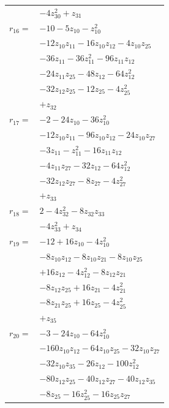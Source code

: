\begin{longtable}{@{}r@{\;}l@{}}
 & \(\displaystyle -4z_{30}^{2} +z_{31}\) \\[3pt]
\(r_{16}=\) & \(\displaystyle -10 -5z_{10} -z_{10}^{2}\) \\
 & \(\displaystyle -12z_{10}z_{11} -16z_{10}z_{12} -4z_{10}z_{25}\) \\
 & \(\displaystyle -36z_{11} -36z_{11}^{2} -96z_{11}z_{12}\) \\
 & \(\displaystyle -24z_{11}z_{25} -48z_{12} -64z_{12}^{2}\) \\
 & \(\displaystyle -32z_{12}z_{25} -12z_{25} -4z_{25}^{2}\) \\
 & \(\displaystyle +z_{32}\) \\[3pt]
\(r_{17}=\) & \(\displaystyle -2 -24z_{10} -36z_{10}^{2}\) \\
 & \(\displaystyle -12z_{10}z_{11} -96z_{10}z_{12} -24z_{10}z_{27}\) \\
 & \(\displaystyle -3z_{11} -z_{11}^{2} -16z_{11}z_{12}\) \\
 & \(\displaystyle -4z_{11}z_{27} -32z_{12} -64z_{12}^{2}\) \\
 & \(\displaystyle -32z_{12}z_{27} -8z_{27} -4z_{27}^{2}\) \\
 & \(\displaystyle +z_{33}\) \\[3pt]
\(r_{18}=\) & \(\displaystyle 2 -4z_{32}^{2} -8z_{32}z_{33}\) \\
 & \(\displaystyle -4z_{33}^{2} +z_{34}\) \\[3pt]
\(r_{19}=\) & \(\displaystyle -12 +16z_{10} -4z_{10}^{2}\) \\
 & \(\displaystyle -8z_{10}z_{12} -8z_{10}z_{21} -8z_{10}z_{25}\) \\
 & \(\displaystyle +16z_{12} -4z_{12}^{2} -8z_{12}z_{21}\) \\
 & \(\displaystyle -8z_{12}z_{25} +16z_{21} -4z_{21}^{2}\) \\
 & \(\displaystyle -8z_{21}z_{25} +16z_{25} -4z_{25}^{2}\) \\
 & \(\displaystyle +z_{35}\) \\[3pt]
\(r_{20}=\) & \(\displaystyle -3 -24z_{10} -64z_{10}^{2}\) \\
 & \(\displaystyle -160z_{10}z_{12} -64z_{10}z_{25} -32z_{10}z_{27}\) \\
 & \(\displaystyle -32z_{10}z_{35} -26z_{12} -100z_{12}^{2}\) \\
 & \(\displaystyle -80z_{12}z_{25} -40z_{12}z_{27} -40z_{12}z_{35}\) \\
 & \(\displaystyle -8z_{25} -16z_{25}^{2} -16z_{25}z_{27}\) \\

\end{longtable}
